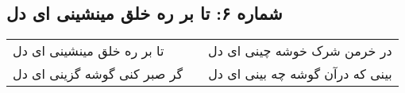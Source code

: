 \begin{center}
\section*{شماره ۶: تا بر ره خلق مینشینی ای دل}
\label{sec:006}
\begin{longtable}{l p{0.5cm} r}
تا بر ره خلق مینشینی ای دل
&&
در خرمن شرک خوشه چینی ای دل
\\
گر صبر کنی گوشه گزینی ای دل
&&
بینی که درآن گوشه چه بینی ای دل
\\
\end{longtable}
\end{center}
